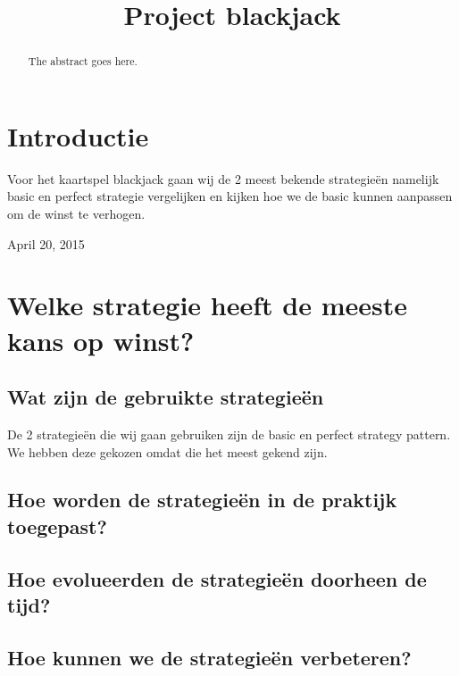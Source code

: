 \documentclass[conference]{IEEEtran}
\begin{document}
\title{Project blackjack}

\author{
}
\maketitle

\begin{abstract}
The abstract goes here.
\end{abstract}

\IEEEpeerreviewmaketitle

\section{Introductie}
Voor het kaartspel blackjack gaan wij de 2 meest bekende strategieën namelijk basic en perfect strategie vergelijken en kijken hoe we de basic kunnen aanpassen om de winst te verhogen.

 
\hfill April 20, 2015

\section{Welke strategie heeft de meeste kans op winst?}

\subsection{Wat zijn de gebruikte strategieën}
De 2 strategieën die wij gaan gebruiken zijn de basic en perfect strategy pattern. We hebben deze gekozen omdat die het meest gekend zijn.

\subsection{Hoe worden de strategieën in de praktijk toegepast?}

\subsection{Hoe evolueerden de strategieën doorheen de tijd?}

\subsection{Hoe kunnen we de strategieën verbeteren?}
\end{document}
